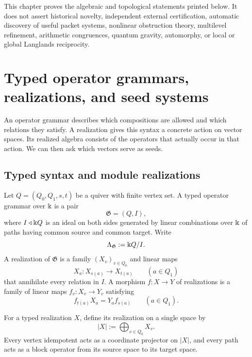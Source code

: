 \begin{boundary}
\label{bnd:symbolic-scope}
This chapter proves the algebraic and topological statements printed below.  It does not assert historical novelty, independent external certification, automatic discovery of useful packet systems, nonlinear obstruction theory, multilevel refinement, arithmetic congruences, quantum gravity, automorphy, or local or global Langlands reciprocity.
\end{boundary}

\section{Typed operator grammars, realizations, and seed systems}
\begin{readerroadmap}
An operator grammar describes which compositions are allowed and which relations they satisfy.  A realization gives this syntax a concrete action on vector spaces.  Its realized algebra consists of the operators that actually occur in that action.  We can then ask which vectors serve as seeds.
\end{readerroadmap}
\subsection{Typed syntax and module realizations}

\begin{definition}
\label{def:typed-grammar}
Let $Q=(Q_0,Q_1,s,t)$ be a quiver with finite vertex set.  A typed operator grammar over $\Bbbk$ is a pair
\[
\mathfrak G=(Q,I),
\]
where $I\triangleleft \Bbbk Q$ is an ideal on both sides generated by linear combinations over $\Bbbk$ of paths having common source and common target.  Write
\[
\Lambda_{\mathfrak G}:=\Bbbk Q/I.
\]
A realization of $\mathfrak G$ is a family $(X_v)_{v\in Q_0}$ and linear maps
\[
X_a:X_{s(a)}\longrightarrow X_{t(a)}
\qquad(a\in Q_1)
\]
that annihilate every relation in $I$.  A morphism $f:X\to Y$ of realizations is a family of linear maps $f_v:X_v\to Y_v$ satisfying
\[
f_{t(a)}X_a=Y_af_{s(a)}
\qquad(a\in Q_1).
\]
\end{definition}

\begin{definition}
\label{def:collapsed-realization}
For a typed realization $X$, define its realization on a single space by
\[
|X|:=\bigoplus_{v\in Q_0}X_v.
\]
Every vertex idempotent acts as a coordinate projector on $|X|$, and every path acts as a block operator from its source space to its target space.
\end{definition}

